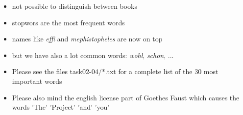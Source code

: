 \begin{frame}[t]
	\begin{itemize}
		\begin{itemize}
			\item not possible to distinguish between books
			\item stopwors are the most frequent words
		\end{itemize}
		\begin{itemize}
			\item names like \textit{effi} and \textit{mephistopheles} are now on top
			\item but we have also a lot common words: \textit{wohl}, \textit{schon}, ...
		\end{itemize}
		
		\begin{itemize}
			\item Please see the files task02-04/*.txt for a complete list of the 30 most
					important words
			\item Please also mind the english license part of Goethes Faust 
					which causes the words 'The' 'Project' 'and' 'you'
	\end{itemize}
\end{itemize}
\end{frame}